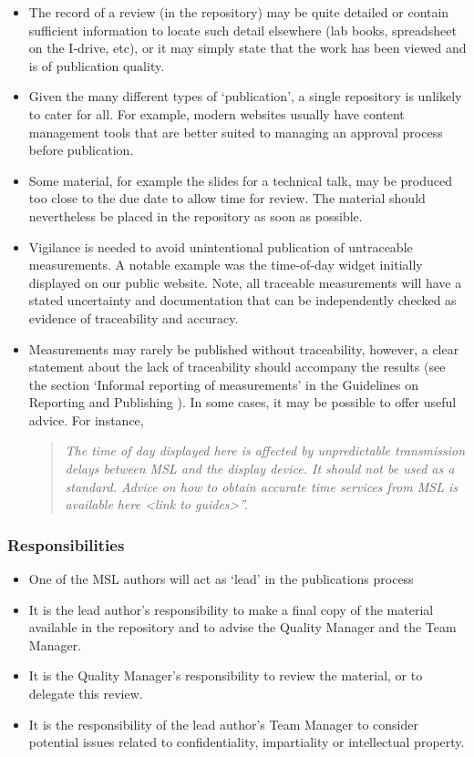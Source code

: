 \begin{itemize}
\item  The record of a review (in the repository) may be quite detailed or contain sufficient information to locate such detail elsewhere (lab books, spreadsheet on the I-drive, etc), or it may simply state that the work has been viewed and is of publication quality.  
\item  Given the many different types of ‘publication’, a single repository is unlikely to cater for all. For example, modern websites usually have content management tools that are better suited to managing an approval process before publication.  
\item  Some material, for example the slides for a technical talk, may be produced too close to the due date to allow time for review. The material should nevertheless be placed in the repository as soon as possible. 
\item  Vigilance is needed to avoid unintentional publication of untraceable measurements. A notable example was the time-of-day widget initially displayed on our public website. Note, all traceable measurements will have a stated uncertainty and documentation that can be independently checked as evidence of traceability and accuracy.
\item  Measurements may rarely be published without traceability, however, a clear statement about the lack of traceability should accompany the results (see the section ‘Informal reporting of measurements’ in the Guidelines on Reporting and Publishing \cite{MSL_Reporting_Guidelines}). In some cases, it may be possible to offer useful advice. For instance, 
\begin{quote}\textit{
The time of day displayed here is affected by unpredictable transmission delays between MSL and the display device. It should not be used as a standard. Advice on how to obtain accurate time services from MSL is available here <link to guides>”.
}\end{quote} 
\end{itemize}

\subsubsection{Responsibilities}
\begin{itemize}
\item  One of the MSL authors will act as ‘lead’ in the publications process
\item  It is the lead author’s responsibility to make a final copy of the material available in the repository and to advise the Quality Manager and the Team Manager.
\item  It is the Quality Manager’s responsibility to review the material, or to delegate this review.
\item  It is the responsibility of the lead author’s Team Manager to consider potential issues related to confidentiality, impartiality or intellectual property.
\end{itemize}

